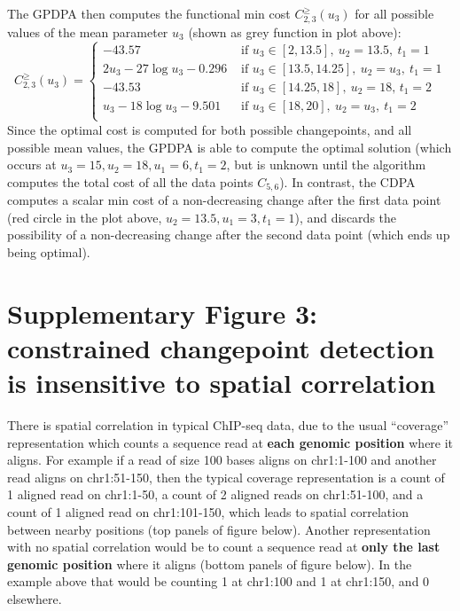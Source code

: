 \documentclass{article}
\begin{document}
The GPDPA then computes the functional min cost $C^\geq_{2,3}(u_3)$ for all
possible values of the mean parameter $u_3$ (shown as grey function in plot
above):
\begin{equation}
C^\geq_{2,3}(u_3)  =
\begin{cases}
  -43.57 & \text{ if } u_3\in[2, 13.5],\ u_2=13.5,\ t_1=1\\
  2u_3 -27 \log u_3 -0.296 & \text{ if } u_3\in[13.5, 14.25],\ u_2=u_3,\ t_1=1\\
  -43.53 & \text{ if } u_3\in[14.25, 18],\ u_2=18,\, t_1=2\\
  u_3 -18 \log u_3 -9.501  & \text{ if } u_3\in[18, 20],\ u_2=u_3,\ t_1=2\\
\end{cases}
\end{equation}
Since the optimal cost is computed for both possible changepoints, and
all possible mean values, the GPDPA is able to compute the optimal
solution (which occurs at $u_3=15, u_2=18, u_1=6, t_1=2$, but is
unknown until the algorithm computes the total cost of all the data
points $C_{5,6}$). In contrast, the CDPA computes a scalar min cost of
a non-decreasing change after the first data point (red circle in the
plot above, $u_2=13.5, u_1=3, t_1=1$), and discards the possibility of
a non-decreasing change after the second data point (which ends up
being optimal).

\newpage
\section*{Supplementary Figure 3: constrained changepoint detection is insensitive to spatial correlation}

There is spatial correlation in typical ChIP-seq data, due to the
usual ``coverage'' representation which counts a sequence
read at \textbf{each genomic position} where it aligns. For example if a read
of size 100 bases aligns on chr1:1-100 and another read aligns on
chr1:51-150, then the typical coverage representation is a count of 1
aligned read on chr1:1-50, a count of 2 aligned reads on chr1:51-100,
and a count of 1 aligned read on chr1:101-150, which leads to spatial
correlation between nearby positions (top panels of figure
below). Another representation with no spatial correlation would be to
count a sequence read at \textbf{only the last genomic position} where it
aligns (bottom panels of figure below). In the example above that
would be counting 1 at chr1:100 and 1 at chr1:150, and 0 elsewhere. 
\end{document}
